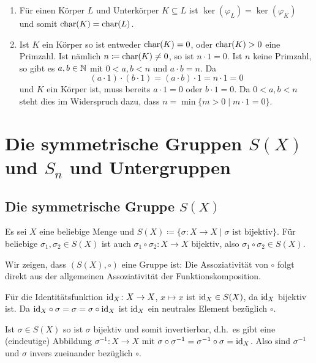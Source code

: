 \begin{bem}
 \begin{enumerate}[leftmargin=*]
  \item
   Für einen Körper $L$ und Unterkörper $K \subseteq L$ ist $\ker(\varphi_L) = \ker(\varphi_K)$ und somit $\mathrm{char}(K) = \mathrm{char}(L)$.
  \item
   Ist $K$ ein Körper so ist entweder $\mathrm{char}(K) = 0$, oder $\mathrm{char}(K) > 0$ eine Primzahl. Ist nämlich $n \coloneqq \mathrm{char}(K) \neq 0$, so ist $n \cdot 1 = 0$. Ist $n$ keine Primzahl, so gibt es $a, b \in \mathbb{N}$ mit $0 < a,b < n$ und $a \cdot b = n$. Da
   \[
    (a \cdot 1) \cdot (b \cdot 1)
    = (a \cdot b) \cdot 1
    = n \cdot 1
    = 0
   \]
   und $K$ ein Körper ist, muss bereits $a \cdot 1 = 0$ oder $b \cdot 1 = 0$. Da $0 < a,b < n$ steht dies im Widerspruch dazu, dass $n = \min \{m > 0 \mid m \cdot 1 = 0\}$.
 \end{enumerate}
\end{bem}





\section{Die symmetrische Gruppen \texorpdfstring{$S(X)$}{S(X)} und \texorpdfstring{$S_n$}{Sn} und Untergruppen}



\subsection{Die symmetrische Gruppe \texorpdfstring{$S(X)$}{S(X)}}

Es sei $X$ eine beliebige Menge und $S(X) \coloneqq \{\sigma \colon X \to X \mid \text{$\sigma$ ist bijektiv}\}$. Für beliebige $\sigma_1, \sigma_2 \in S(X)$ ist auch $\sigma_1 \circ \sigma_2 \colon X \to X$ bijektiv, also $\sigma_1 \circ \sigma_2 \in S(X)$.

Wir zeigen, dass $(S(X), \circ)$ eine Gruppe ist: Die Assoziativität von $\circ$ folgt direkt aus der allgemeinen Assoziativität der Funktionskomposition.

Für die Identitätsfunktion $\mathrm{id}_X \colon X \to X$, $x \mapsto x$ ist $\mathrm{id}_X \in S(X)$, da $\mathrm{id}_X$ bijektiv ist. Da $\mathrm{id}_X \circ \sigma = \sigma = \sigma \circ \mathrm{id}_X$ ist $\mathrm{id}_X$ ein neutrales Element bezüglich $\circ$.

Ist $\sigma \in S(X)$ so ist $\sigma$ bijektiv und somit invertierbar, d.h.\ es gibt eine (eindeutige) Abbildung $\sigma^{-1} \colon X \to X$ mit $\sigma \circ \sigma^{-1} = \sigma^{-1} \circ \sigma = \mathrm{id}_X$. Also sind $\sigma^{-1}$ und $\sigma$ invers zueinander bezüglich $\circ$.

